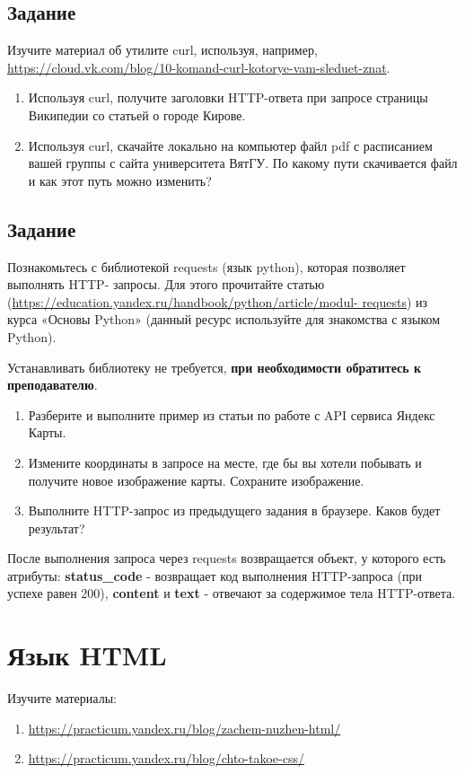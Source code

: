 \documentclass[a4paper,12pt]{extarticle}
\begin{document}
\subsection{Задание}

Изучите материал об утилите curl, используя, например, \url{https://cloud.vk.com/blog/10-komand-curl-kotorye-vam-sleduet-znat}.

\begin{enumerate}[label=\alph*)]
  \item Используя curl, получите заголовки HTTP-ответа при запросе страницы Википедии со статьей о городе Кирове.
  \item Используя curl, скачайте локально на компьютер файл pdf с расписанием вашей группы с сайта университета ВятГУ. По какому пути скачивается файл и как этот путь можно изменить?
\end{enumerate}

\subsection{Задание}
Познакомьтесь с библиотекой requests (язык python), которая позволяет выполнять HTTP-
запросы. Для этого прочитайте статью (\url{https://education.yandex.ru/handbook/python/article/modul-
requests}) из курса «Основы Python» (данный ресурс используйте для знакомства с языком Python).

Устанавливать библиотеку не требуется, \textbf{при необходимости обратитесь к преподавателю}.
\begin{enumerate}[label=\alph*)]
  \item Разберите и выполните пример из статьи по работе с API сервиса Яндекс Карты.
  \item Измените координаты в запросе на месте, где бы вы хотели побывать и получите новое изображение карты. Сохраните изображение.
  \item Выполните HTTP-запрос из предыдущего задания в браузере. Каков будет результат?
\end{enumerate}

\begin{leftbar}
  После выполнения запроса через requests возвращается объект, у которого есть атрибуты: \textbf{status\_code} - возвращает код выполнения HTTP-запроса (при успехе равен 200), \textbf{content} и \textbf{text} - отвечают за содержимое тела HTTP-ответа.
\end{leftbar}

\section{Язык HTML}
Изучите материалы:
\begin{enumerate}
  \item \url{https://practicum.yandex.ru/blog/zachem-nuzhen-html/}
  \item \url{https://practicum.yandex.ru/blog/chto-takoe-css/}
\end{enumerate}
\end{document}
